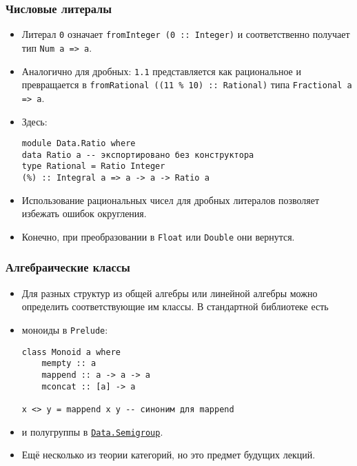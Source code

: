 \documentclass[10pt]{beamer}
\begin{document}
\begin{frame}[fragile]
\frametitle{Числовые литералы}
\begin{itemize}
    \item Литерал \lstinline|0| означает \lstinline|fromInteger (0 :: Integer)| и соответственно получает тип \pause\lstinline|Num a => a|.
    \item Аналогично для дробных: \lstinline|1.1| представляется как рациональное и превращается в \lstinline|fromRational ((11 % 10) :: Rational)| типа \lstinline|Fractional a => a|.
    \item Здесь:
\begin{lstlisting}
module Data.Ratio where
data Ratio a -- экспортировано без конструктора
type Rational = Ratio Integer
(%) :: Integral a => a -> a -> Ratio a
\end{lstlisting}
    \pause
    \item Использование рациональных чисел для дробных литералов позволяет избежать ошибок округления.\pause
    \item Конечно, при преобразовании в \lstinline|Float| или \lstinline|Double| они вернутся.
\end{itemize}
\end{frame}

\begin{frame}[fragile]
\frametitle{Алгебраические классы}
\begin{itemize}
    \item Для разных структур из общей алгебры или линейной алгебры можно определить соответствующие им классы. В стандартной библиотеке есть
    \item моноиды в \lstinline|Prelude|:
\begin{lstlisting}
class Monoid a where
    mempty :: a
    mappend :: a -> a -> a
    mconcat :: [a] -> a
    
x <> y = mappend x y -- синоним для mappend
\end{lstlisting}
    \item и полугруппы в \href{https://hackage.haskell.org/package/base-4.10.1.0/docs/Data-Semigroup.html}{\lstinline|Data.Semigroup|}. \pause
    \item Ещё несколько из теории категорий, но это предмет будущих лекций.
\end{itemize}
\end{frame}
\end{document}
